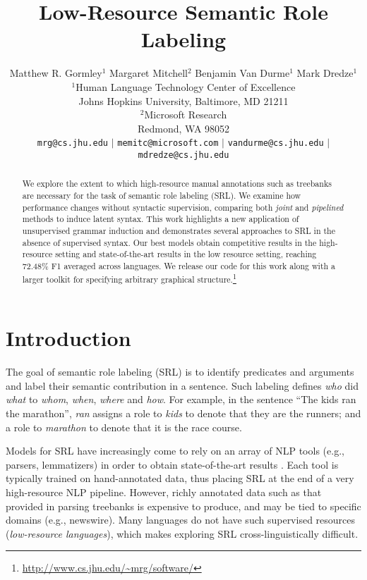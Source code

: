 \documentclass[11pt]{article}
\title{Low-Resource Semantic Role  Labeling}
\author{Matthew R. Gormley$^{1}$ Margaret Mitchell$^2$ Benjamin Van Durme$^1$ Mark Dredze$^1$\vspace{.25em}\\
$^1$Human Language Technology Center of Excellence \\\vspace{.25em}
Johns Hopkins University, Baltimore, MD 21211\\
$^2$Microsoft Research \\\vspace{.15em}
Redmond, WA 98052 \\
{\small {\tt mrg@cs.jhu.edu} $|$ {\tt memitc@microsoft.com} $|$ {\tt vandurme@cs.jhu.edu} $|$ {\tt  mdredze@cs.jhu.edu}}
}
\date{}
\begin{document}
\maketitle
\begin{abstract}

    We explore the extent to which high-resource manual annotations 
    such as treebanks  
    are necessary for the task of semantic role labeling (SRL).
    We examine how performance changes without syntactic supervision, 
    comparing both {\it joint} and {\it pipelined} 
    methods to induce latent syntax.  
    This work highlights a new 
   application of unsupervised grammar induction and demonstrates 
    several approaches to SRL in the absence of supervised syntax.
    Our best models obtain competitive results in the 
    high-resource setting and state-of-the-art results in the low 
    resource setting, reaching 72.48\% F1 averaged across languages.  
    We release our code for this work along with a larger toolkit for specifying arbitrary 
    graphical structure.\footnote{\url{http://www.cs.jhu.edu/~mrg/software/}}

\end{abstract}

\section{Introduction}
\label{sec:introduction}

The goal of semantic role labeling (SRL) is to identify predicates and
arguments and label their semantic contribution in a sentence.
Such labeling defines {\it who} did
{\it what} to {\it whom}, {\it when}, {\it where} and {\it how}. 
For example, in
the sentence ``The kids ran the marathon'',  {\it ran} assigns a 
role to {\it kids} to denote that they are the runners; 
and a role to {\it marathon} to denote that it is the race course.  

Models for SRL have increasingly come to rely
on an array of NLP tools (e.g., parsers, lemmatizers) in order to obtain state-of-the-art
results \cite{bjorkelund_multilingual_2009,zhao_multilingual_2009}.
Each tool is typically trained on hand-annotated data, thus placing
SRL at the end of a very high-resource NLP pipeline. 
However, richly annotated data such as that provided in parsing
treebanks is expensive to produce, and may be tied to specific
domains (e.g., newswire).  Many languages do not have such 
supervised resources ({\it low-resource languages}), which makes 
exploring SRL cross-linguistically difficult.
\end{document}
